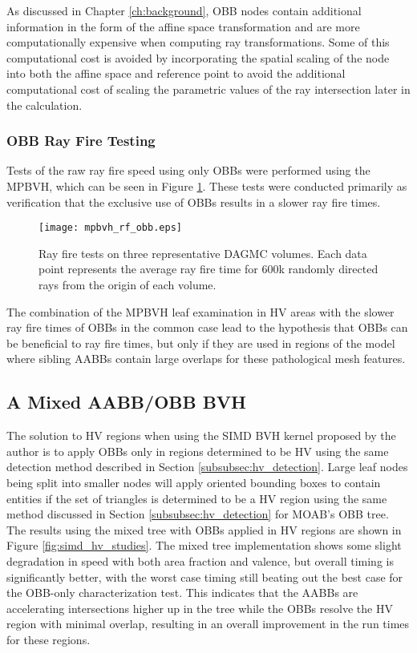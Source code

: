 As discussed in Chapter \ref{ch:background}, OBB nodes contain additional
information in the form of the affine space transformation and are more
computationally expensive when computing ray transformations. Some of this
computational cost is avoided by incorporating the spatial scaling of the node
into both the affine space and reference point to avoid the additional
computational cost of scaling the parametric values of the ray intersection
later in the calculation.

\subsubsection{OBB Ray Fire Testing}

Tests of the raw ray fire speed using only OBBs were performed using the
MPBVH, which can be seen in Figure
\ref{fig:rf_test_results_obbs}. These tests were conducted primarily as
verification that the exclusive use of OBBs results in a slower ray fire times. 

\begin{figure}[H]
  \centering
  \texttt{[image: mpbvh\_rf\_obb.eps]}
  \caption[Ray fire timings for the MPBVH with oriented bounding boxes.]{Ray
    fire tests on three representative DAGMC volumes. Each data point represents
    the average ray fire time for 600k randomly directed rays from the origin of
    each volume.}
  \label{fig:rf_test_results_obbs}
\end{figure}

The combination of the MPBVH leaf examination in HV areas with the slower ray
fire times of OBBs in the common case lead to the hypothesis that OBBs can be
beneficial to ray fire times, but only if they are used in regions of the model
where sibling AABBs contain large overlaps for these pathological mesh features.

\subsection{A Mixed AABB/OBB BVH}

The solution to HV regions when using the SIMD BVH
kernel proposed by the author is to apply OBBs only in regions determined to be
HV using the same detection method described in Section
\ref{subsubsec:hv_detection}. Large leaf nodes being split into smaller nodes
will apply oriented bounding boxes to contain entities if the set of triangles
is determined to be a HV region using the same method discussed in
Section \ref{subsubsec:hv_detection} for MOAB's OBB tree. The results using the mixed tree with
OBBs applied in HV regions are shown in Figure \ref{fig:simd_hv_studies}. The
mixed tree implementation shows some slight degradation in speed with both area
fraction and valence, but overall timing is significantly better, with the worst
case timing still beating out the best case for the OBB-only characterization
test. This indicates that the AABBs are accelerating intersections higher up in
the tree while the OBBs resolve the HV region with minimal overlap,
resulting in an overall improvement in the run times for these regions.

